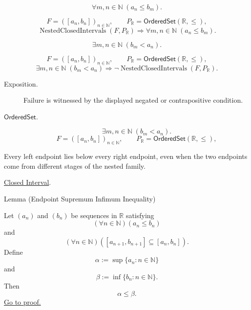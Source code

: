 \begin{remark*}
\[
\forall m,n\in\mathbb{N}\;(a_n\le b_m).
\]
\end{remark*}

\begin{remark*}
\[
F=([a_n,b_n])_{n\in\mathbb{N}},\qquad P_{\mathbb{R}}=\mathsf{OrderedSet}(\mathbb{R},\leq),
\]
\[
\operatorname{NestedClosedIntervals}(F,P_{\mathbb{R}})
\Longrightarrow
\forall m,n\in\mathbb{N}\;(a_n\le b_m).
\]
\end{remark*}

\begin{remark*}
\[
\exists m,n\in\mathbb{N}\;(b_m<a_n).
\]
\end{remark*}

\begin{remark*}
\[
F=([a_n,b_n])_{n\in\mathbb{N}},\qquad P_{\mathbb{R}}=\mathsf{OrderedSet}(\mathbb{R},\leq),
\]
\[
\exists m,n\in\mathbb{N}\;(b_m<a_n)
\Longrightarrow
\neg\operatorname{NestedClosedIntervals}(F,P_{\mathbb{R}}).
\]
\end{remark*}

\begin{remark*}
\begin{description}
  \item[Exposition.]
  Failure is witnessed by the displayed negated or contrapositive condition.

  \item[\(\mathsf{OrderedSet}.\)]
  \[
\exists m,n\in\mathbb{N}\;(b_m<a_n).
\]
\[
F=([a_n,b_n])_{n\in\mathbb{N}},\qquad P_{\mathbb{R}}=\mathsf{OrderedSet}(\mathbb{R},\leq),
\]
\end{description}
\end{remark*}

\begin{remark*}[Interpretation]
Every left endpoint lies below every right endpoint, even when the two
endpoints come from different stages of the nested family.
\end{remark*}

\begin{dependencies}
\hyperref[def:closed-interval]{Closed Interval}.
\end{dependencies}

\begin{lemmabox}{Lemma (Endpoint Supremum Infimum Inequality)}
\begin{lemma}
\label{lem:endpoint-supremum-infimum-inequality}
Let $(a_n)$ and $(b_n)$ be sequences in $\mathbb{R}$ satisfying
\[
  (\forall n\in\mathbb{N})(a_n\leq b_n)
\]
and
\[
  (\forall n\in\mathbb{N})([a_{n+1},b_{n+1}]\subseteq [a_n,b_n]).
\]
Define
\[
  \alpha:=\sup\{a_n:n\in\mathbb{N}\}
\]
and
\[
  \beta:=\inf\{b_n:n\in\mathbb{N}\}.
\]
Then
\[
  \alpha\leq\beta.
\]
\hyperref[prf:endpoint-supremum-infimum-inequality]{Go to proof.}
\end{lemma}
\end{lemmabox}

